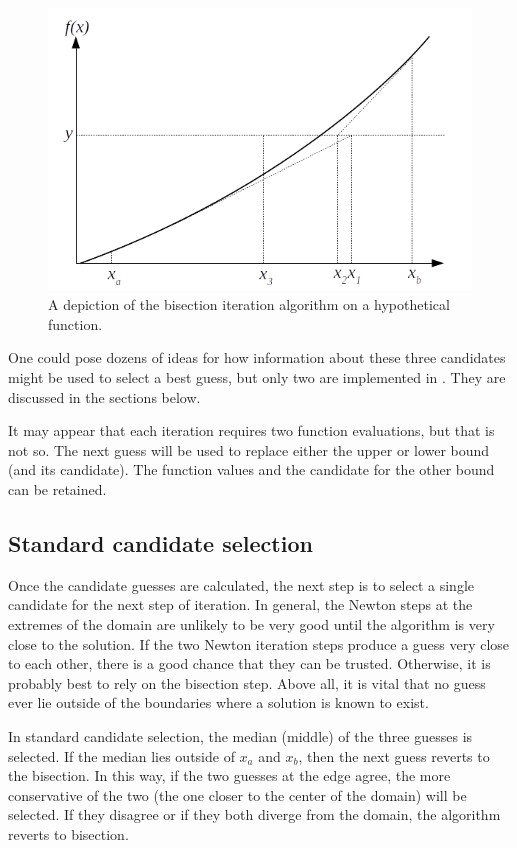 \begin{figure}
\centering
\includegraphics[width=0.97\linewidth]{figures/hybrid1}
\caption{A depiction of the bisection iteration algorithm on a hypothetical function.}\label{fig:hybrid}
\end{figure}

One could pose dozens of ideas for how information about these three candidates might be used to select a best guess, but only two are implemented in \PM.  They are discussed in the sections below.

It may appear that each iteration requires two function evaluations, but that is not so.  The next guess will be used to replace either the upper or lower bound (and its candidate).  The function values and the candidate for the other bound can be retained.

\subsection{Standard candidate selection}

Once the candidate guesses are calculated, the next step is to select a single candidate for the next step of iteration.  In general, the Newton steps at the extremes of the domain are unlikely to be very good until the algorithm is very close to the solution.  If the two Newton iteration steps produce a guess very close to each other, there is a good chance that they can be trusted.  Otherwise, it is probably best to rely on the bisection step.  Above all, it is vital that no guess ever lie outside of the boundaries where a solution is known to exist.

In standard candidate selection, the median (middle) of the three guesses is selected.  If the median lies outside of $x_a$ and $x_b$, then the next guess reverts to the bisection.  In this way, if the two guesses at the edge agree, the more conservative of the two (the one closer to the center of the domain) will be selected.  If they disagree or if they both diverge from the domain, the algorithm reverts to bisection.

